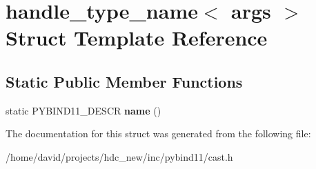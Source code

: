 \hypertarget{structhandle__type__name_3_01args_01_4}{}\section{handle\+\_\+type\+\_\+name$<$ args $>$ Struct Template Reference}
\label{structhandle__type__name_3_01args_01_4}
\subsection*{Static Public Member Functions}
\begin{DoxyCompactItemize}
\item 
static P\+Y\+B\+I\+N\+D11\+\_\+\+D\+E\+S\+CR {\bfseries name} ()\hypertarget{structhandle__type__name_3_01args_01_4_a67234191260246ca1a4a2efebab3a421}{}\label{structhandle__type__name_3_01args_01_4_a67234191260246ca1a4a2efebab3a421}

\end{DoxyCompactItemize}


The documentation for this struct was generated from the following file\+:\begin{DoxyCompactItemize}
\item 
/home/david/projects/hdc\+\_\+new/inc/pybind11/cast.\+h\end{DoxyCompactItemize}
